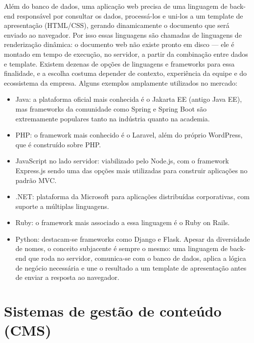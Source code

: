 Além do banco de dados, uma aplicação web precisa de uma linguagem de back-end responsável por consultar os dados, processá-los e uni-los a um template de apresentação (HTML/CSS), gerando dinamicamente o documento que será enviado ao navegador. Por isso essas linguagens são chamadas de linguagens de renderização dinâmica: o documento web não existe pronto em disco — ele é montado em tempo de execução, no servidor, a partir da combinação entre dados e template. Existem dezenas de opções de linguagens e frameworks para essa finalidade, e a escolha costuma depender de contexto, experiência da equipe e do ecossistema da empresa. Alguns exemplos amplamente utilizados no mercado:

\begin{itemize}
  \item Java: a plataforma oficial mais conhecida é o Jakarta EE (antigo Java EE), mas frameworks da comunidade como Spring e Spring Boot são extremamente populares tanto na indústria quanto na academia.
  \item PHP: o framework mais conhecido é o Laravel, além do próprio WordPress, que é construído sobre PHP.
  \item JavaScript no lado servidor: viabilizado pelo Node.js, com o framework Express.js sendo uma das opções mais utilizadas para construir aplicações no padrão MVC.
  \item .NET: plataforma da Microsoft para aplicações distribuídas corporativas, com suporte a múltiplas linguagens.
  \item Ruby: o framework mais associado a essa linguagem é o Ruby on Rails.
  \item Python: destacam-se frameworks como Django e Flask. Apesar da diversidade de nomes, o conceito subjacente é sempre o mesmo: uma linguagem de back-end que roda no servidor, comunica-se com o banco de dados, aplica a lógica de negócio necessária e une o resultado a um template de apresentação antes de enviar a resposta ao navegador.
\end{itemize}

\section{Sistemas de gestão de conteúdo (CMS)}

